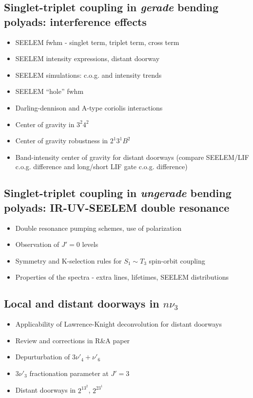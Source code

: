 \documentclass[12pt]{article}
\begin{document}
\subsection{Singlet-triplet coupling in \emph{gerade} bending polyads:
  interference effects}
\begin{itemize}
\item SEELEM fwhm - singlet term, triplet term, cross term
\item SEELEM intensity expressions, distant doorway
\item SEELEM simulations: c.o.g. and intensity trends
\item SEELEM ``hole'' fwhm 
\item Darling-dennison and A-type coriolis interactions
\item Center of gravity in $3^2 4^2$
\item Center of gravity robustness in $2^1 3^1 B^2$
\item Band-intensity center of gravity for distant doorways (compare
  SEELEM/LIF c.o.g. difference and long/short LIF gate c.o.g. difference)
\end{itemize}

\subsection{Singlet-triplet coupling in \emph{ungerade} bending polyads:
  IR-UV-SEELEM double resonance}
\begin{itemize}
\item Double resonance pumping schemes, use of polarization
\item Observation of $J'=0$ levels
\item Symmetry and K-selection rules for $S_1 \sim T_3$ spin-orbit coupling
\item Properties of the spectra - extra lines, lifetimes, SEELEM distributions
\end{itemize}

\subsection{Local and distant doorways in $n \nu_3$}
\begin{itemize}
\item Applicability of Lawrence-Knight deconvolution for distant doorways
\item Review and corrections in R\&A paper
\item Depurturbation of $3\nu'_4 + \nu'_6$
\item $3\nu'_3$ fractionation parameter at $J' = 3$
\item Distant doorways in $2^13^2$, $2^23^1$
\end{itemize}
\end{document}
